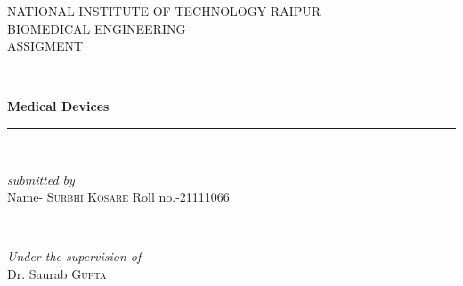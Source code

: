 \documentclass[12pt]{article}
\begin{document}
\date{}

\begin{titlepage} %
	\newcommand{\HRule}{\rule{\linewidth}{0.5mm}} %
	
	\center %
	
	
	\textsc{\LARGE NATIONAL INSTITUTE OF TECHNOLOGY   RAIPUR}\\[1.5cm] %
	
	\textsc{\Large BIOMEDICAL ENGINEERING }\\[0.5cm] %
	
	\textsc{\large ASSIGMENT}\\[0.5cm] %
	
	
	
	
	
	
	\HRule\\[0.4cm]
	
	{\huge\bfseries Medical Devices}\\[0.4cm] %
	
	\HRule\\[1.5cm]
	
	
	\begin{minipage}{0.4\textwidth}
		\begin{flushleft}
			\large
			\textit{submitted by}\\
			Name- \textsc{Surbhi Kosare} %
			Roll no.-21111066 %
			
			
		\end{flushleft}
	\end{minipage}
	~
	\begin{minipage}{0.4\textwidth}
		\begin{flushright}
			\large
			\textit{Under the supervision of}\\
			Dr. Saurab \textsc{Gupta} %
		\end{flushright}
	\end{minipage}
	

\end{titlepage}
\end{document}
